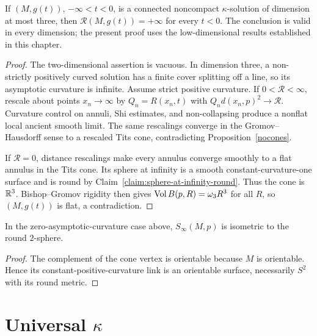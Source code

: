\begin{proposition}\label{prop:asymptotic-scalar-curvature-infinite}
\label{asympscal}

If $(M,g(t))$, $-\infty<t<0$, is a connected noncompact
$\kappa$-solution of dimension at most three, then
$\mathcal R(M,g(t))=+\infty$ for every $t<0$.
The conclusion is valid in every dimension; the present proof uses
the low-dimensional results established in this chapter.
\end{proposition}
\begin{proof}
\sketch
{}
The two-dimensional assertion is vacuous. In dimension three, a
non-strictly positively curved solution has a finite cover splitting
off a line, so its asymptotic curvature is infinite. Assume strict
positive curvature. If $0<\mathcal R<\infty$, rescale about points
$x_n\to\infty$ by $Q_n=R(x_n,t)$ with
$Q_nd(x_n,p)^2\to\mathcal R$. Curvature control on annuli, Shi
estimates, and non-collapsing produce a nonflat local ancient smooth
limit. The same rescalings converge in the Gromov--Hausdorff sense
to a rescaled Tits cone, contradicting Proposition~\ref{nocones}.

If $\mathcal R=0$, distance rescalings make every annulus converge
smoothly to a flat annulus in the Tits cone. Its sphere at infinity
is a smooth constant-curvature-one surface and is round by
Claim~\ref{claim:sphere-at-infinity-round}. Thus the cone is
$\mathbb{R}^3$. Bishop--Gromov rigidity then gives
$\operatorname{Vol} B(p,R)=\omega_3R^3$ for all $R$, so $(M,g(t))$ is flat, a
contradiction.
\end{proof}

\begin{claim}\label{claim:sphere-at-infinity-round}
In the zero-asymptotic-curvature case above,
$S_\infty(M,p)$ is isometric to the round $2$-sphere.
\end{claim}
\begin{proof}
\sketch The complement of the cone vertex is orientable because
$M$ is orientable. Hence its constant-positive-curvature link is an
orientable surface, necessarily $S^2$ with its round metric.
\end{proof}

\section{Universal $\kappa$}


